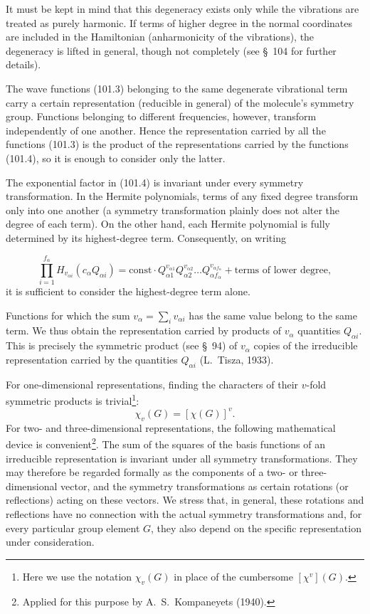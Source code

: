 It must be kept in mind that this degeneracy exists only while the vibrations
are treated as purely harmonic. If terms of higher degree in the normal
coordinates are included in the Hamiltonian (anharmonicity of the
vibrations), the degeneracy is lifted in general, though not completely (see
\S~104 for further details).

The wave functions (101.3) belonging to the same degenerate vibrational term
carry a certain representation (reducible in general) of the molecule's
symmetry group. Functions belonging to different frequencies, however,
transform independently of one another. Hence the representation carried by
all the functions (101.3) is the product of the representations carried by
the functions (101.4), so it is enough to consider only the latter.

The exponential factor in (101.4) is invariant under every symmetry
transformation. In the Hermite polynomials, terms of any fixed degree
transform only into one another (a symmetry transformation plainly does not
alter the degree of each term). On the other hand, each Hermite polynomial is
fully determined by its highest-degree term. Consequently, on writing

\[
 \prod_{i=1}^{f_\alpha}H_{v_{\alpha i}}(c_\alpha Q_{\alpha i})
 =\mathrm{const}\cdot Q_{\alpha1}^{v_{\alpha1}}Q_{\alpha2}^{v_{\alpha2}}\ldots
 Q_{\alpha f_\alpha}^{v_{\alpha f_\alpha}}+\text{terms of lower degree},
\]
it is sufficient to consider the highest-degree term alone.

Functions for which the sum $v_\alpha=\sum_i v_{\alpha i}$ has the same value
belong to the same term. We thus obtain the representation carried by products
of $v_\alpha$ quantities $Q_{\alpha i}$. This is precisely the symmetric
product (see \S~94) of $v_\alpha$ copies of the irreducible representation
carried by the quantities $Q_{\alpha i}$ (L.~Tisza, 1933).

For one-dimensional representations, finding the characters of their
$v$-fold symmetric products is trivial\footnote{Here we use the notation
$\chi_v(G)$ in place of the cumbersome $[\chi^v](G)$.}:
\[
 \chi_v(G)=[\chi(G)]^v.
\]
For two- and three-dimensional representations, the following mathematical
device is convenient\footnote{Applied for this purpose by A.~S.~Kompaneyets
(1940).}. The sum of the squares of the basis functions of an irreducible
representation is invariant under all symmetry transformations. They may
therefore be regarded formally as the components of a two- or
three-dimensional vector, and the symmetry transformations as certain
rotations (or reflections) acting on these vectors. We stress that, in
general, these rotations and reflections have no connection with the actual
symmetry transformations and, for every particular group element $G$, they
also depend on the specific representation under consideration.

